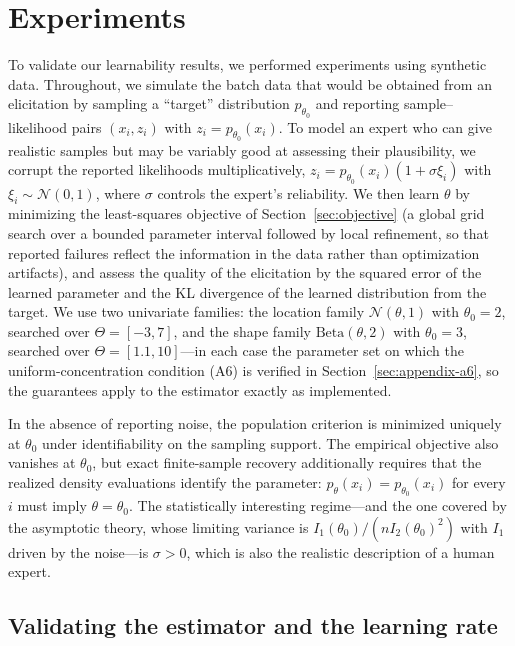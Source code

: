\section{Experiments}
\label{sec:elicitation-experiments}

To validate our learnability results, we performed experiments using synthetic data. Throughout, we simulate the batch data that would be obtained from an elicitation by sampling a ``target'' distribution $p_{\theta_0}$ and reporting sample--likelihood pairs $(x_i, z_i)$ with $z_i = p_{\theta_0}(x_i)$. To model an expert who can give realistic samples but may be variably good at assessing their plausibility, we corrupt the reported likelihoods multiplicatively, $z_i = p_{\theta_0}(x_i)(1+\sigma\xi_i)$ with $\xi_i\sim\mathcal{N}(0,1)$, where $\sigma$ controls the expert's reliability. We then learn $\theta$ by minimizing the least-squares objective of Section~\ref{sec:objective} (a global grid search over a bounded parameter interval followed by local refinement, so that reported failures reflect the information in the data rather than optimization artifacts), and assess the quality of the elicitation by the squared error of the learned parameter and the KL divergence of the learned distribution from the target. We use two univariate families: the location family $\mathcal{N}(\theta,1)$ with $\theta_0=2$, searched over $\Theta=[-3,7]$, and the shape family $\mathrm{Beta}(\theta,2)$ with $\theta_0=3$, searched over $\Theta=[1.1,10]$---in each case the parameter set on which the uniform-concentration condition (A6) is verified in Section~\ref{sec:appendix-a6}, so the guarantees apply to the estimator exactly as implemented.

In the absence of reporting noise, the population criterion is minimized uniquely at $\theta_0$ under identifiability on the sampling support. The empirical objective also vanishes at $\theta_0$, but exact finite-sample recovery additionally requires that the realized density evaluations identify the parameter: $p_\theta(x_i)=p_{\theta_0}(x_i)$ for every $i$ must imply $\theta=\theta_0$. The statistically interesting regime---and the one covered by the asymptotic theory, whose limiting variance is $I_1(\theta_0)/(nI_2(\theta_0)^2)$ with $I_1$ driven by the noise---is $\sigma>0$, which is also the realistic description of a human expert.

\subsection{Validating the estimator and the learning rate}

